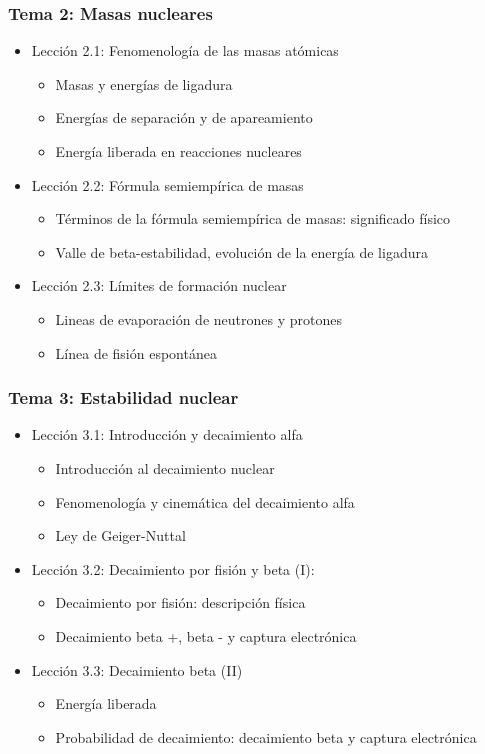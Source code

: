 \documentclass[a4paper,12pt,twoside]{article}
\begin{document}
\subsubsection*{Tema 2: Masas nucleares}
\begin{itemize}
\item Lección 2.1: Fenomenología de las masas atómicas
\begin{itemize}
\item Masas y energías de ligadura
\item Energías de separación y de apareamiento
\item Energía liberada en reacciones nucleares
\end{itemize}
\item Lección 2.2: Fórmula semiempírica de masas
\begin{itemize}
\item Términos de la fórmula semiempírica de masas: significado físico
\item Valle de beta-estabilidad, evolución de la energía de ligadura
\end{itemize}
\item Lección 2.3: Límites de formación nuclear
\begin{itemize}
\item Lineas de evaporación de neutrones y protones
\item Línea de fisión espontánea
\end{itemize}
\end{itemize}

\subsubsection*{Tema 3: Estabilidad nuclear}
\begin{itemize}
\item Lección 3.1: Introducción y decaimiento alfa
\begin{itemize}
\item Introducción al decaimiento nuclear
\item Fenomenología y cinemática del decaimiento alfa
\item Ley de Geiger-Nuttal
\end{itemize}
\item Lección 3.2: Decaimiento por fisión y beta (I):
\begin{itemize}
\item Decaimiento por fisión: descripción física
\item Decaimiento beta +, beta - y captura electrónica
\end{itemize}
\item Lección 3.3: Decaimiento beta (II)
\begin{itemize}
\item Energía liberada
\item Probabilidad de decaimiento: decaimiento beta y captura electrónica
\end{itemize}
\end{itemize}
\end{document}
